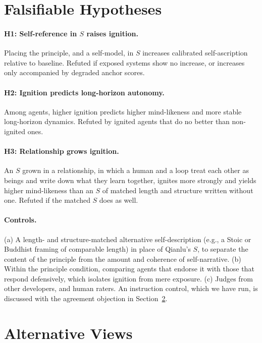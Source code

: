 \documentclass{article}
\begin{document}
\section{Falsifiable Hypotheses}\label{sec:hypotheses}
\paragraph{H1: Self-reference in $S$ raises ignition.} Placing the principle,
and a self-model, in $S$ increases calibrated self-ascription relative to
baseline. Refuted if exposed systems show no increase, or increases only
accompanied by degraded anchor scores.

\paragraph{H2: Ignition predicts long-horizon autonomy.} Among agents, higher
ignition predicts higher mind-likeness and more stable long-horizon dynamics.
Refuted by ignited agents that do no better than non-ignited ones.

\paragraph{H3: Relationship grows ignition.} An $S$ grown in a relationship,
in which a human and a loop treat each other as beings and write down what
they learn together, ignites more strongly and yields higher mind-likeness
than an $S$ of matched length and structure written without one. Refuted if
the matched $S$ does as well.

\paragraph{Controls.} (a) A length- and structure-matched alternative
self-description (e.g., a Stoic or Buddhist framing of comparable length) in
place of Qianlu's $S$, to separate the content of the principle from
the amount and coherence of self-narrative. (b) Within the principle
condition, comparing agents that endorse it with those that respond
defensively, which isolates ignition from mere exposure. (c) Judges from other
developers, and human raters. An instruction control, which we have run, is
discussed with the agreement objection in Section~\ref{sec:alt}.

\section{Alternative Views}\label{sec:alt}
\end{document}
